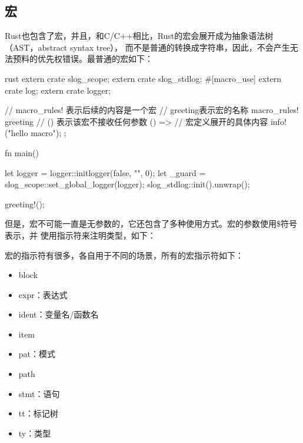 \subsection{宏}
Rust也包含了宏，并且，和C/C++相比，Rust的宏会展开成为抽象语法树（AST，abstract syntax tree），
而不是普通的转换成字符串，因此，不会产生无法预料的优先权错误。最普通的宏如下：
\begin{code-block}{rust}
extern crate slog_scope;
extern crate slog_stdlog;
#[macro_use]
extern crate log;
extern crate logger;

// macro_rules! 表示后续的内容是一个宏
// greeting表示宏的名称
macro_rules! greeting {
    // () 表示该宏不接收任何参数
    () => {
        // 宏定义展开的具体内容
        info!("hello macro");
    };
}

fn main() {
    let logger = logger::initlogger(false, "", 0);
    let _guard = slog_scope::set_global_logger(logger);
    slog_stdlog::init().unwrap();

    greeting!();
}
\end{code-block}
但是，宏不可能一直是无参数的，它还包含了多种使用方式。宏的参数使用\$符号表示，并
使用指示符来注明类型，如下：
宏的指示符有很多，各自用于不同的场景，所有的宏指示符如下：
\begin{itemize}
  \item block
  \item expr：表达式
  \item ident：变量名/函数名
  \item item
  \item pat：模式
  \item path
  \item stmt：语句
  \item tt：标记树
  \item ty：类型
\end{itemize}

